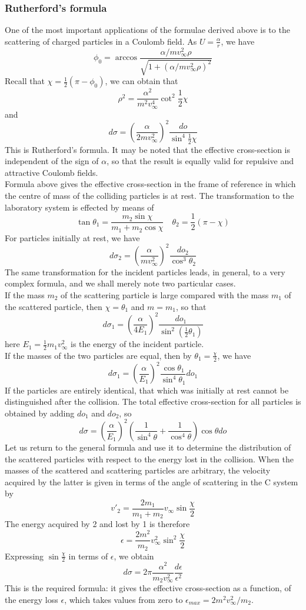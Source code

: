 \subsubsection{Rutherford's formula}
One of the most important applications of the formulae derived above is to the scattering of charged particles in a Coulomb field. As $U = \frac{\alpha}{r}$, we have
\[\phi_0 = \arccos \frac{\alpha/mv^2_{\infty}\rho}{\sqrt{1+(\alpha/mv^2_{\infty}\rho)^2}}\]
Recall that $\chi = \frac{1}{2}(\pi-\phi_0)$, we can obtain that
\[\rho^2 = \frac{\alpha^2}{m^2v_{\infty}^4} \cot^2 \frac{1}{2}\chi\]
and
\[d\sigma = \left( \frac{\alpha}{2mv_{\infty}^2} \right)^2 \frac{do}{\sin^4 \frac{1}{2}\chi}\]
This is Rutherford's formula. It may be noted that the effective cross-section is independent of the sign of $\alpha$, so that the result is equally valid for repulsive
and attractive Coulomb fields.\\
Formula above gives the effective cross-section in the frame of reference in which the centre of mass of the colliding particles is at rest. The transformation to the laboratory system is effected by means of
\[\tan\theta_1 = \frac{m_2\sin\chi}{m_1 + m_2 \cos\chi} \quad \theta_2 = \frac{1}{2}(\pi - \chi)\]
For particles initially at rest, we have
\[d\sigma_2 = \left ( \frac{\alpha}{mv^2_{\infty}} \right )^2 \frac{do_2}{\cos^3 \theta_2}\]
The same transformation for the incident particles leads, in general, to a very complex formula, and we shall merely note two particular cases.\\
If the mass $m_2$ of the scattering particle is large compared with the mass $m_1$ of the scattered particle, then $\chi = \theta_1$ and $m = m_1$, so that
\[d\sigma_1 = \left ( \frac{\alpha}{4E_1}\right )^2 \frac{do_1}{\sin^2 (\frac{1}{2}\theta_1)}\]
here $E_1 = \frac{1}{2}m_1v^2_{\infty}$ is the energy of the incident particle.\\
If the masses of the two particles are equal, then by $\theta_1 = \frac{\chi}{2}$, we have
\[d\sigma_1 =  \left ( \frac{\alpha}{E_1}\right )^2 \frac{\cos\theta_1}{\sin^4\theta_1} do_1\]
If the particles are entirely identical, that which was initially at rest cannot be distinguished after the collision. The total effective cross-section for all
particles is obtained by adding $do_1$ and $do_2$, so
\[d\sigma = \left ( \frac{\alpha}{E_1}\right )^2 \left ( \frac{1}{\sin^4\theta} + \frac{1}{\cos^4\theta} \right )\cos\theta do\]
Let us return to the general formula and use it to determine the distribution of the scattered particles with respect to the energy lost in the collision. 
When the masses of the scattered and scattering particles are arbitrary, the velocity acquired by the latter is given in terms of the angle of scattering in the C system by
\[v'_2 = \frac{2m_1}{m_1+m_2} v_{\infty} \sin \frac{\chi}{2}\]
The energy acquired by 2 and lost by 1 is therefore
\[\epsilon = \frac{2m^2}{m_2} v_{\infty}^2 \sin^2 \frac{\chi}{2} \]
Expressing $\sin \frac{\chi}{2}$ in terms of $\epsilon$, we obtain
\[d\sigma = 2\pi \frac{\alpha^2}{m_2 v^2_{\infty}} \frac{d\epsilon}{\epsilon^2}\]
This is the required formula: it gives the effective cross-section as a function, of the energy loss $\epsilon$, which takes values from zero to $\epsilon_{max} = 2m^2 v_{\infty}^2 /m_2$.

